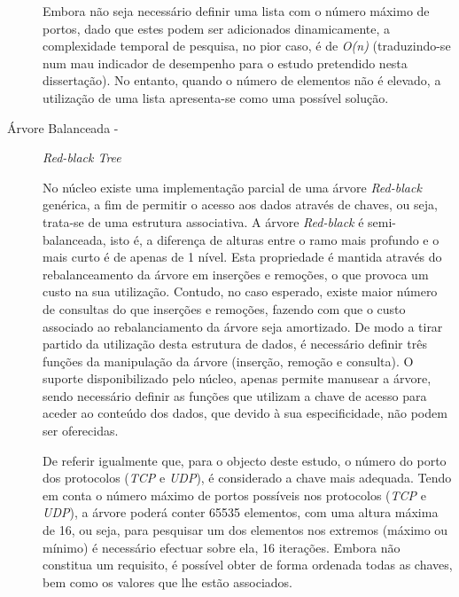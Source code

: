 \begin{description}
Embora não seja necessário definir uma lista com o número máximo de portos, dado que estes podem ser adicionados dinamicamente, a complexidade temporal de pesquisa, no pior caso, é de \textit{O(n)} (traduzindo-se num mau indicador de desempenho para o estudo pretendido nesta dissertação).
No entanto, quando o número de elementos não é elevado, a utilização de uma lista apresenta-se como uma possível solução.



\item[Árvore Balanceada - ] \textit{Red-black Tree} 

No núcleo existe uma implementação parcial de uma árvore \textit{Red-black} genérica, a fim de permitir o acesso aos dados através de chaves, ou seja, trata-se de uma estrutura associativa.
A árvore \textit{Red-black} é semi-balanceada, isto é, a diferença de alturas entre o ramo mais profundo e o mais curto é de apenas de 1 nível.
Esta propriedade é mantida através do rebalanceamento da árvore em inserções e remoções, o que provoca um custo na sua utilização.
Contudo, no caso esperado, existe maior número de consultas do que inserções e remoções, fazendo com que o custo associado ao rebalanciamento da árvore seja amortizado.
De modo a tirar partido da utilização desta estrutura de dados, é necessário definir três funções da manipulação da árvore (inserção, remoção e consulta).
O suporte disponibilizado pelo núcleo, apenas permite manusear a árvore, sendo necessário definir as funções que utilizam a chave de acesso para aceder ao conteúdo dos dados, que devido à sua especificidade, não podem ser oferecidas.

De referir igualmente que, para o objecto deste estudo, o número do porto dos protocolos (\textit{TCP} e \textit{UDP}), é considerado a chave mais adequada.
Tendo em conta o número máximo de portos possíveis nos protocolos (\textit{TCP} e \textit{UDP}), a árvore poderá conter 65535 elementos, com uma altura máxima de 16, ou seja, para pesquisar um dos elementos nos extremos (máximo ou mínimo) é necessário efectuar sobre ela, 16 iterações.
Embora não constitua um requisito, é possível obter de forma ordenada todas as chaves, bem como os valores que lhe estão associados.


\end{description}
